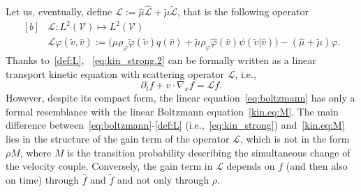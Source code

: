 \documentclass[a4paper]{article}
\theoremstyle{Theorem}\newtheorem{proposition}{Proposition}[section]
\theoremstyle{Remark}\newtheorem{remark}{Remark}[section]
\theoremstyle{Theorem}\newtheorem{theorem}{Theorem}[section]
\newcommand{\hv}{\hat{v}}
\newcommand{\tv}{\tilde{v}}
\newcommand{\hf}{\hat{f}}
\newcommand{\tf}{\tilde{f}}
\newcommand{\hphi}{\hat{\varphi}}
\newcommand{\tphi}{\tilde{\varphi}}
\newcommand{\hmu}{\hat{\mu}}
\newcommand{\tmu}{\tilde{\mu}}
\begin{document}
Let us, eventually, define $\mathcal{L}:= \hmu \hat{\mathcal{L}} +  \tmu\tilde{\mathcal{L}}$, that is the following operator
\begin{equation}\label{def:L}
\begin{aligned}[b]
&\mathcal{L}: L^2 (\mathcal{V}) \longmapsto L^2 (\mathcal{V})\\[0.3cm]
&\mathcal{L}\varphi(\tv,\hv):=\big(\hmu\rho_\varphi \tphi(\tv) q(\hv)+\tmu\rho_\varphi \hphi(\hv)\psi(\tv|\hv)\big)-(\hmu+\tmu)\varphi. 
  \end{aligned}
\end{equation}
Thanks to~\eqref{def:L}, ~\eqref{eq:kin_strong.2} can be formally written as a linear transport kinetic equation with scattering operator $\mathcal{L}$, i.e.,
\begin{equation}\label{eq:boltzmann}
\partial_t f +v \cdot \nabla_x f=\mathcal{L}f.   
\end{equation}
However, despite its compact form, the linear equation~\eqref{eq:boltzmann} has only a formal resemblance with the linear Boltzmann equation~\eqref{kin.eq:M}. The main difference between~\eqref{eq:boltzmann}-\eqref{def:L} (i.e.,~\eqref{eq:kin_strong}) and~\eqref{kin.eq:M} lies in the structure of the gain term of the operator $\mathcal{L}$, which is not in the form $\rho M$, where $M$ is the transition probability describing the simultaneous change of the velocity couple. Conversely, the gain term in $\mathcal{L}$ depends on $f$ (and then also on time) through $\hf$ and $\tf$ and not only through $\rho$. %
\end{document}
